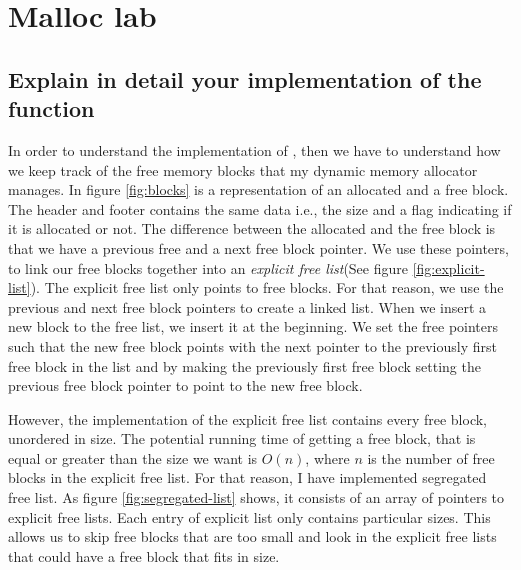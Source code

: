 \section{Malloc lab}

\subsection{Explain in detail your implementation of the  function}
In order to understand the implementation of , then we have to understand how we keep track of the free memory blocks that my dynamic memory allocator manages. In figure \ref{fig:blocks} is a representation of an allocated and a free block. The header and footer contains the same data i.e., the size and a flag indicating if it is allocated or not. The difference between the allocated and the free block is that we have a previous free and a next free block pointer. We use these pointers, to link our free blocks together into an \textit{explicit free list}(See figure \ref{fig:explicit-list}).
The explicit free list only points to free blocks. For that reason, we use the previous and next free block pointers to create a linked list. 
When we insert a new block to the free list, we insert it at the beginning. We set the free pointers such that the new free block points with the next pointer to the previously first free block in the list and by making the previously first free block setting the previous free block pointer to point to the new free block.

However, the implementation of the explicit free list contains every free block, unordered in size. The potential running time of getting a free block, that is equal or greater than the size we want is $O(n)$, where $n$ is the number of free blocks in the explicit free list. For that reason, I have implemented segregated free list. As figure \ref{fig:segregated-list} shows, it consists of an array of pointers to explicit free lists. Each entry of explicit list only contains particular sizes. 
This allows us to skip free blocks that are too small and look in the explicit free lists that could have a free block that fits in size.

